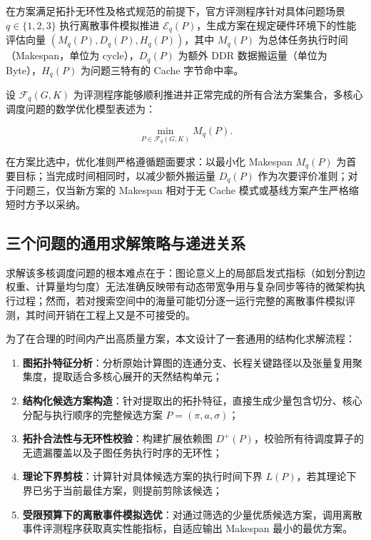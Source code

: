\documentclass[anonymous,notoc]{gmcm2026}
\providecommand{\tightlist}{\setlength{\itemsep}{0pt}\setlength{\parskip}{0pt}}
\begin{document}
在方案满足拓扑无环性及格式规范的前提下，官方评测程序针对具体问题场景 \(q \in \{1, 2, 3\}\) 执行离散事件模拟推进 \(\mathcal{E}_q(P)\)，生成方案在规定硬件环境下的性能评估向量 \((M_q(P), D_q(P), H_q(P))\)，其中 \(M_q(P)\) 为总体任务执行时间（Makespan，单位为 cycle），\(D_q(P)\) 为额外 DDR 数据搬运量（单位为 Byte），\(H_q(P)\) 为问题三特有的 Cache 字节命中率。

设 \(\mathcal{F}_q(G, K)\) 为评测程序能够顺利推进并正常完成的所有合法方案集合，多核心调度问题的数学优化模型表述为：

\begin{equation}
\min_{P \in \mathcal{F}_q(G, K)} M_q(P).
\end{equation}

在方案比选中，优化准则严格遵循题面要求：以最小化 Makespan \(M_q(P)\) 为首要目标；当完成时间相同时，以减少额外搬运量 \(D_q(P)\) 作为次要评价准则；对于问题三，仅当新方案的 Makespan 相对于无 Cache 模式或基线方案产生严格缩短时方予以采纳。

\subsection{三个问题的通用求解策略与递进关系}

求解该多核调度问题的根本难点在于：图论意义上的局部启发式指标（如划分割边权重、计算量均匀度）无法准确反映带有动态带宽争用与复杂同步等待的微架构执行过程；然而，若对搜索空间中的海量可能切分逐一运行完整的离散事件模拟评测，其时间开销在工程上又是不可接受的。

为了在合理的时间内产出高质量方案，本文设计了一套通用的结构化求解流程：

\begin{enumerate}
\def\labelenumi{\arabic{enumi}.}
\tightlist
\item
  \textbf{图拓扑特征分析}：分析原始计算图的连通分支、长程关键路径以及张量复用聚集度，提取适合多核心展开的天然结构单元；
\item
  \textbf{结构化候选方案构造}：针对提取出的拓扑特征，直接生成少量包含切分、核心分配与执行顺序的完整候选方案 \(P = (\pi, a, \sigma)\)；
\item
  \textbf{拓扑合法性与无环性校验}：构建扩展依赖图 \(D^+(P)\)，校验所有待调度算子的无遗漏覆盖以及子图任务执行时序的无环性；
\item
  \textbf{理论下界剪枝}：计算针对具体候选方案的执行时间下界 \(L(P)\)，若其理论下界已劣于当前最佳方案，则提前剪除该候选；
\item
  \textbf{受限预算下的离散事件模拟选优}：对通过筛选的少量优质候选方案，调用离散事件评测程序获取真实性能指标，自适应输出 Makespan 最小的最优方案。
\end{enumerate}
\end{document}
